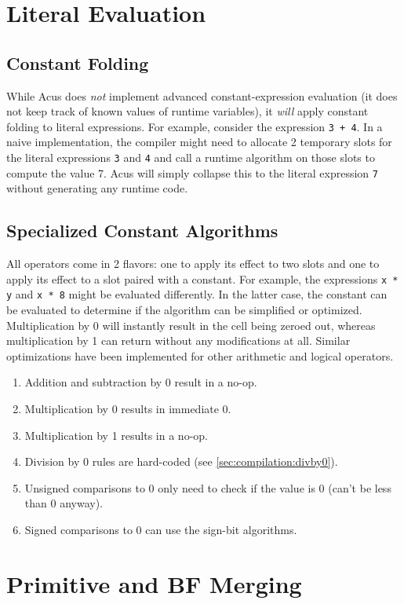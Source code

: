 \section{Literal Evaluation}
\subsection{Constant Folding}
While Acus does \emph{not} implement advanced constant-expression evaluation (it does not keep track of known values of runtime variables), it \emph{will} apply constant folding to literal expressions. For example, consider the expression \texttt{3 + 4}. In a naive implementation, the compiler might need to allocate 2 temporary slots for the literal expressions \texttt{3} and \texttt{4} and call a runtime algorithm on those slots to compute the value 7. Acus will simply collapse this to the literal expression \texttt{7} without generating any runtime code.

\subsection{Specialized Constant Algorithms}
All operators come in 2 flavors: one to apply its effect to two slots and one to apply its effect to a slot paired with a constant. For example, the expressions \texttt{x * y} and \texttt{x * 8} might be evaluated differently. In the latter case, the constant can be evaluated to determine if the algorithm can be simplified or optimized. Multiplication by 0 will instantly result in the cell being zeroed out, whereas multiplication by 1 can return without any modifications at all. Similar optimizations have been implemented for other arithmetic and logical operators.
\begin{enumerate}\itemsep0em
\item Addition and subtraction by 0 result in a no-op.
\item Multiplication by 0 results in immediate 0.
\item Multiplication by 1 results in a no-op.
\item Division by 0 rules are hard-coded (see \ref{sec:compilation:divby0}).
\item Unsigned comparisons to 0 only need to check if the value is 0 (can't be less than 0 anyway).
\item Signed comparisons to 0 can use the sign-bit algorithms.
\end{enumerate}

\section{Primitive and BF Merging}
